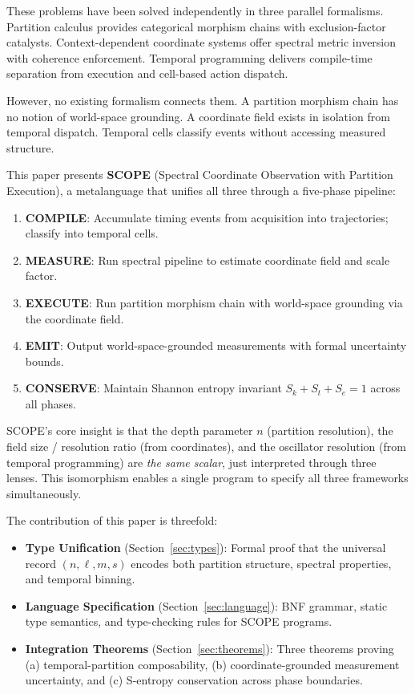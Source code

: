 \documentclass[11pt,twocolumn]{article}
\begin{document}
These problems have been solved independently in three parallel formalisms. Partition calculus provides categorical morphism chains with exclusion-factor catalysts. Context-dependent coordinate systems offer spectral metric inversion with coherence enforcement. Temporal programming delivers compile-time separation from execution and cell-based action dispatch.

However, no existing formalism connects them. A partition morphism chain has no notion of world-space grounding. A coordinate field exists in isolation from temporal dispatch. Temporal cells classify events without accessing measured structure.

This paper presents \textbf{SCOPE} (Spectral Coordinate Observation with Partition Execution), a metalanguage that unifies all three through a five-phase pipeline:

\begin{enumerate}
\item \textbf{COMPILE}: Accumulate timing events from acquisition into trajectories; classify into temporal cells.
\item \textbf{MEASURE}: Run spectral pipeline to estimate coordinate field and scale factor.
\item \textbf{EXECUTE}: Run partition morphism chain with world-space grounding via the coordinate field.
\item \textbf{EMIT}: Output world-space-grounded measurements with formal uncertainty bounds.
\item \textbf{CONSERVE}: Maintain Shannon entropy invariant $S_k + S_t + S_e = 1$ across all phases.
\end{enumerate}

SCOPE's core insight is that the depth parameter $n$ (partition resolution), the field size / resolution ratio (from coordinates), and the oscillator resolution (from temporal programming) are \textit{the same scalar}, just interpreted through three lenses. This isomorphism enables a single program to specify all three frameworks simultaneously.

The contribution of this paper is threefold:

\begin{itemize}
\item \textbf{Type Unification} (Section~\ref{sec:types}): Formal proof that the universal record $(n, \ell, m, s)$ encodes both partition structure, spectral properties, and temporal binning.
\item \textbf{Language Specification} (Section~\ref{sec:language}): BNF grammar, static type semantics, and type-checking rules for SCOPE programs.
\item \textbf{Integration Theorems} (Section~\ref{sec:theorems}): Three theorems proving (a) temporal-partition composability, (b) coordinate-grounded measurement uncertainty, and (c) S-entropy conservation across phase boundaries.
\end{itemize}
\end{document}
